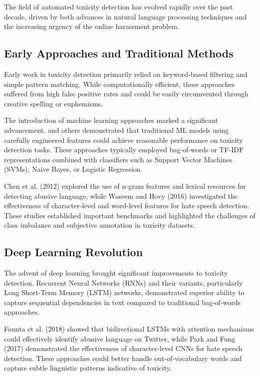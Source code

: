 \documentclass[11pt]{article}
\begin{document}
The field of automated toxicity detection has evolved rapidly over the past decade, driven by both advances in natural language processing techniques and the increasing urgency of the online harassment problem.

\subsection{Early Approaches and Traditional Methods}

Early work in toxicity detection primarily relied on keyword-based filtering and simple pattern matching. While computationally efficient, these approaches suffered from high false positive rates and could be easily circumvented through creative spelling or euphemisms. 

The introduction of machine learning approaches marked a significant advancement. \citet{scikit-learn} and others demonstrated that traditional ML models using carefully engineered features could achieve reasonable performance on toxicity detection tasks. These approaches typically employed bag-of-words or TF-IDF representations combined with classifiers such as Support Vector Machines (SVMs), Naive Bayes, or Logistic Regression.

Chen et al. (2012) explored the use of n-gram features and lexical resources for detecting abusive language, while Waseem and Hovy (2016) investigated the effectiveness of character-level and word-level features for hate speech detection. These studies established important benchmarks and highlighted the challenges of class imbalance and subjective annotation in toxicity datasets.

\subsection{Deep Learning Revolution}

The advent of deep learning brought significant improvements to toxicity detection. Recurrent Neural Networks (RNNs) and their variants, particularly Long Short-Term Memory (LSTM) networks, demonstrated superior ability to capture sequential dependencies in text compared to traditional bag-of-words approaches.

Founta et al. (2018) showed that bidirectional LSTMs with attention mechanisms could effectively identify abusive language on Twitter, while Park and Fung (2017) demonstrated the effectiveness of character-level CNNs for hate speech detection. These approaches could better handle out-of-vocabulary words and capture subtle linguistic patterns indicative of toxicity.
\end{document}
